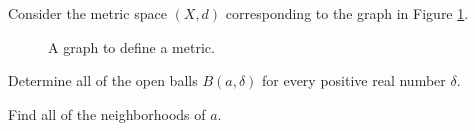 Consider the metric space $(X,d)$ corresponding to the graph in Figure \ref{F:Graph_metric_ex}. 
\begin{figure}[h]
\begin{center}
\caption{A graph to define a metric.} 
\label{F:Graph_metric_ex}
\end{center}
\end{figure}
\ba
\item Determine all of the open balls $B(a,\delta)$ for every positive real number $\delta$. 

\item Find all of the neighborhoods of $a$. 

\ea

\begin{comment}

\ExerciseSolution

\ba

\item First we list the distances from $a$ to the other points in $X$:
\begin{center}
\begin{tabular}{c|cccc}
$x$		&$b$	&$c$&$d$&$e$ \\
$d(a,x)$	&$3$&$8$&$6$&$1$
\end{tabular}
\end{center}
So 
\begin{itemize}
\item if $\delta \leq 1$, then $B(a,\delta) = \{a\}$; \\
\item if $1< \delta \leq 3$, then $B(a,\delta) = \{a,e\}$; \\
\item if $3< \delta \leq 6$, then $B(a,\delta) = \{a,b,e\}$; \\
\item if $6< \delta \leq 8$, then $B(a,\delta) = \{a,b,d,e\}$; \\
\item if $8< \delta$, then $B(a,\delta) =X$.
\end{itemize}

\item Every neighborhood of $a$ must contain $a$, and if $A$ is a subset of $X$ that contains $a$, then $B(a,1) = \{a\}$ is a subset of $A$. So the neighborhoods of $a$ are the subsets of $X$ that contain $a$.  

\ea

\end{comment}

